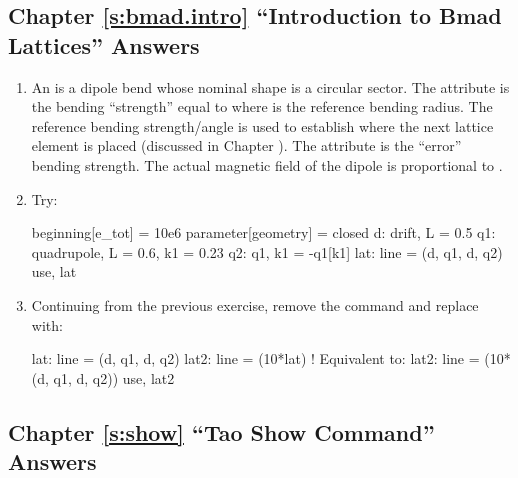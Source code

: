\documentclass{hitec}     %
\begin{document}
\subsection[Chapter \ref*{s:bmad.intro.ex} ``Introduction to Bmad Lattices'']{Chapter \hyperref[s:bmad.intro.ex]{\ref*{s:bmad.intro}} ``Introduction to Bmad Lattices'' Answers}
\label{s:ans.lat}

\begin{enumerate}[label=\ref*{s:bmad.intro}.\arabic{enumi}]
\item
An  is a dipole bend whose nominal shape is a circular sector. The  attribute is the
 bending ``strength'' equal to  where  is the reference bending
radius. The reference bending strength/angle is used to establish where the next lattice element is
placed (discussed in Chapter ). The  attribute is the ``error'' bending
strength. The actual magnetic field of the dipole is proportional to .
%
\item
Try:
\begin{code}
beginning[e_tot] = 10e6
parameter[geometry] = closed
d: drift, L = 0.5
q1: quadrupole, L = 0.6, k1 = 0.23
q2: q1, k1 = -q1[k1]
lat: line = (d, q1, d, q2)
use, lat
\end{code}
%
\item
Continuing from the previous exercise, remove the  command and replace with:
\begin{code}
lat: line = (d, q1, d, q2)
lat2: line = (10*lat)  ! Equivalent to:  lat2: line = (10*(d, q1, d, q2))
use, lat2
\end{code}
\end{enumerate}

\subsection[Chapter \ref*{s:show.ex} ``Tao Show Command'']{Chapter \hyperref[s:show.ex]{\ref*{s:show}} ``Tao Show Command'' Answers}
\label{s:ans.show}
\end{document}
